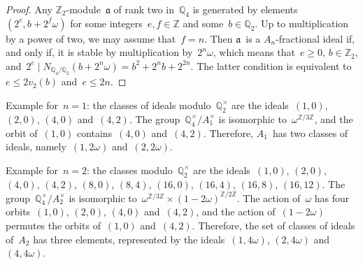 \documentclass{article}
\let\fr\mathfrak
\begin{document}
\begin{proof}
Any $ℤ_2$-module~$\fr a$ of rank two in~$ℚ_4$ is generated
by elements~$(2^e, b + 2^{f} ω)$ for some integers~$e, f ∈ ℤ$ and
some~$b ∈ ℚ_2$. Up to multiplication by a power of two, we may assume
that~$f = n$. Then $\fr a$~is a $A_n$-fractional ideal if, and only if, it is
stable by multiplication by~$2^n ω$, which means that~$e ≥ 0$,
$b ∈ ℤ_2$, and~$2^e ∣ N_{ℚ_4/ℚ_2} (b + 2^n ω) = b^2 + 2^n b + 2^{2n}$.
The latter condition is equivalent to~$e ≤ 2 v_2(b)$ and~$e ≤ 2n$.
\end{proof}

Example for~$n = 1$: the classes of ideals modulo~$ℚ_2^{×}$ are the
ideals~$(1,0)$, $(2,0)$, $(4,0)$ and~$(4,2)$. The group~$ℚ_4^{×}/A_1^{×}$
is isomorphic to~$ω^{ℤ/3ℤ}$, and the orbit of~$(1,0)$ contains~$(4,0)$
and~$(4,2)$. Therefore, $A_1$~has two classes of ideals, namely~$(1,2ω)$
and~$(2, 2 ω)$.

Example for~$n = 2$: the classes modulo~$ℚ_2^{×}$ are the ideals~$(1,0)$,
$(2,0)$, $(4,0)$, $(4,2)$, $(8,0)$, $(8,4)$, $(16,0)$, $(16,4)$,
$(16,8)$, $(16,12)$. The group~$ℚ_4^{×} / A_2^{×}$ is isomorphic
to~$ω^{ℤ/3ℤ} × (1-2ω)^{ℤ/2ℤ}$. The action of~$ω$ has four orbits~$(1,0)$,
$(2,0)$, $(4,0)$ and~$(4,2)$, and the action of~$(1-2ω)$ permutes the
orbits of~$(1,0)$ and~$(4,2)$. Therefore, the set of classes of ideals
of~$A_2$ has three elements, represented by the ideals~$(1, 4 ω)$, $(2, 4
ω)$ and~$(4, 4ω)$.

% 
\end{document}
